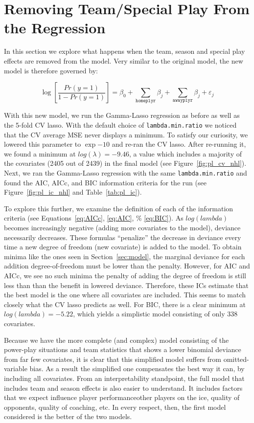 \documentclass[11pt, fleqn]{article}
\begin{document}
\section{Removing Team/Special Play From the Regression}

In this section we explore what happens when the team, season and special play effects are removed from the model.  Very similar to the original model, the new model is therefore governed by:

\[ \log\left[\frac{Pr(y=1)}{1-Pr(y=1)}\right] = \beta_0 + \sum_{\texttt{homeplyr}} \beta_j + \sum_{\texttt{awayplyr}} \beta_j + \varepsilon_j \]

With this new model, we run the Gamma-Lasso regression as before as well as the 5-fold CV lasso.  With the default choice of \texttt{lambda.min.ratio} we noticed that the CV average MSE never displays a minimum.  To satisfy our curiosity, we lowered this parameter to $\exp{-10}$ and re-ran the CV lasso.  After re-running it, we found a minimum at $log(\lambda)=-9.46$, a value which includes a majority of the covariates (2405 out of 2439) in the final model (see Figure~\vref{fig:pl_cv_nhl}).  Next, we ran the Gamma-Lasso regression with the same \texttt{lambda.min.ratio} and found the AIC, AICc, and BIC information criteria for the run (see Figure~\vref{fig:pl_ic_nhl} and Table~\vref{tab:pl_ic}).

To explore this further, we examine the definition of each of the information criteria (see Equations~\eqref{eq:AICc}, \eqref{eq:AIC}, \% \eqref{eq:BIC}).  As $log(lambda)$ becomes increasingly negative (adding more covariates to the model), deviance necessarily decreases.  These formulas ``penalize'' the decrease in deviance every time a new degree of freedom (new covariate) is added to the model.  To obtain minima like the ones seen in Section~\ref{sec:model}, the marginal deviance for each addition degree-of-freedom must be lower than the penalty.  However, for AIC and AICc, we see no such minima \textemdash the penalty of adding the degree of freedom is still less than than the benefit in lowered deviance.  Therefore, these ICs estimate that the best model is the one where all covariates are included.  This seems to match closely what the CV lasso predicts as well.  For BIC, there is a clear minimum at $log(lambda)=-5.22$, which yields a simplistic model consisting of only 338 covariates.



Because we have the more complete (and complex) model consisting of the power-play situations and team statistics that shows a lower binomial deviance from far few covariates, it is clear that this simplified model suffers from omitted-variable bias.  As a result the simplified one compensates the best way it can, by including all covariates. From an interpretability standpoint, the full model that includes team and season effects is also easier to understand. It includes factors that we expect influence player performance\textemdash other players on the ice, quality of opponents, quality of coaching, etc. In every respect, then, the first model considered is the better of the two models.
\end{document}
